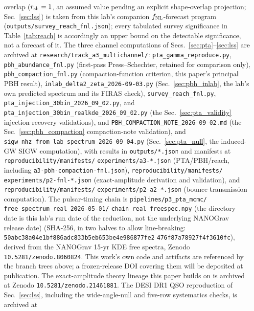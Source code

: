 \documentclass[aps,prd,twocolumn,superscriptaddress,nofootinbib,longbibliography]{revtex4-2}
\begin{document}
overlap ($r_{\rm sh}=1$, an assumed value pending an explicit shape-overlap
projection; Sec.~\ref{sec:lss}) is taken from this lab's companion
$f_{\rm NL}$-forecast program (\texttt{outputs/survey\_reach\_fnl.json});
every tabulated survey significance in Table~\ref{tab:reach} is
accordingly an upper bound on the detectable significance, not a forecast
of it. The three channel computations
of Secs.~\ref{sec:pta}--\ref{sec:lss} are archived at
\texttt{research/track\_a3\_multichannel/}: \texttt{pta\_gamma\_reproduce.py},
\texttt{pbh\_abundance\_fnl.py} (first-pass Press--Schechter, retained for comparison only),
\texttt{pbh\_compaction\_fnl.py} (compaction-function criterion, this paper's principal PBH result),
\texttt{inlab\_delta2\_zeta\_2026-09-03.py} (Sec.~\ref{sec:pbh_inlab}, the
lab's own predicted spectrum and its FIRAS check),
\texttt{survey\_reach\_fnl.py}, \texttt{pta\_injection\_30bin\_2026\_09\_02.py},
and \texttt{pta\_injection\_30bin\_realkde\_2026\_09\_02.py}
(the Sec.~\ref{sec:pta_validity} injection-recovery validations), and
\texttt{PBH\_COMPACTION\_NOTE\_2026-09-02.md} (the Sec.~\ref{sec:pbh_compaction}
compaction-note validation), and
\texttt{sigw\_nhz\_from\_lab\_spectrum\_2026\_09\_04.py} (Sec.~\ref{sec:pta_null},
the induced-GW SIGW computation), with results in \texttt{outputs/*.json} and
manifests at \texttt{reproducibility/manifests/}\allowbreak
\texttt{experiments/a3-*.json} (PTA/PBH/reach, including
\texttt{a3-pbh-compaction-fnl.json}), \texttt{reproducibility/manifests/}\allowbreak
\texttt{experiments/p2-fnl-*.json} (exact-amplitude derivation and validation),
and \texttt{reproducibility/manifests/}\allowbreak
\texttt{experiments/p2-a2-*.json} (bounce-transmission computation). The
pulsar-timing chain is
\texttt{pipelines/p3\_pta\_mcmc/}\allowbreak
\texttt{free\_spectrum\_real\_2026-05-01/}\allowbreak
\texttt{chain\_real\_freespec.npy} (the directory date is this lab's
run date of the reduction, not the underlying NANOGrav release date)
(SHA-256, in two halves to allow line-breaking:
\texttt{50abc38a04e1bf886adc833b5eb653be4e986877fe2}\allowbreak
\texttt{476f87a78927f4f3610fc}),
derived from the NANOGrav 15-yr KDE free
spectra, Zenodo \texttt{10.5281/zenodo.8060824}. This work's own code and
artifacts are referenced by the branch trees above; a frozen-release DOI
covering them will be deposited at publication.
The exact-amplitude theory lineage this
paper builds on is archived at Zenodo \texttt{10.5281/zenodo.21461881}. The
DESI DR1 QSO reproduction of Sec.~\ref{sec:lss}, including the
wide-angle-null and five-row systematics checks, is archived at
\end{document}
